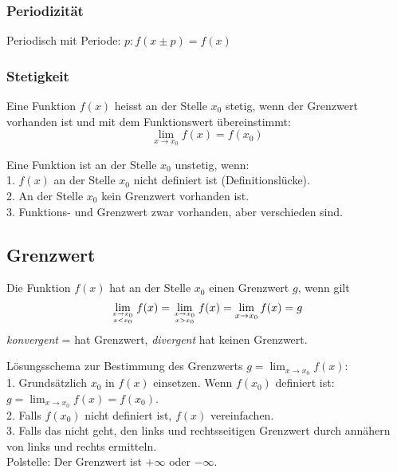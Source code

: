 \subsubsection{Periodizität}
Periodisch mit Periode: $p: f(x \pm p) = f(x)$

\subsubsection{Stetigkeit}
Eine Funktion $f(x)$ heisst an der Stelle $x_0$ stetig, wenn der Grenzwert vorhanden ist und mit dem Funktionswert übereinstimmt:
\begin{equation*}
	\lim_{x\to x_0}{f(x)} = f(x_0)
\end{equation*}

Eine Funktion ist an der Stelle $x_0$ unstetig, wenn:\\
1. $f(x)$ an der Stelle $x_0$ nicht definiert ist (Definitionslücke).\\
2. An der Stelle $x_0$ kein Grenzwert vorhanden ist.\\
3. Funktions- und Grenzwert zwar vorhanden, aber verschieden sind.\\

\subsection{Grenzwert}

Die Funktion $f(x)$ hat an der Stelle $x_0$ einen Grenzwert $g$, wenn gilt
\begin{equation*}
	\lim_{x\to x_0\atop x < x_0}f(x) = \lim_{x\to x_0\atop x > x_0}f(x) = \lim_{x\to x_0}f(x) = g 
\end{equation*}
\textit{konvergent} = hat Grenzwert, \textit{divergent} hat keinen Grenzwert.

Lösungsschema zur Bestimmung des Grenzwerts $g = \lim_{x\to x_0} f(x)$:\\
1. Grundsätzlich $x_0$ in $f(x)$ einsetzen. Wenn $f(x_0)$ definiert ist: $g = \lim_{x\to x_0} f(x) = f(x_0)$.\\
2. Falls $f(x_0)$ nicht definiert ist, $f(x)$ vereinfachen.\\
3. Falls das nicht geht, den links und rechtsseitigen Grenzwert durch annähern von links und rechts ermitteln.\\
Polstelle: Der Grenzwert ist $+\infty$ oder $-\infty$.\\

